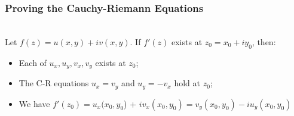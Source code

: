 \documentclass[10pt]{paper}
\newcommand{\gspc}{\vspace{0.13cm}} %
\newcommand{\gline}[0]{\gspc\\} %
\begin{document}
\subsubsection{Proving the Cauchy-Riemann Equations}
{
\newcommand{\zo}{z_0}\newcommand{\de}{\Delta}
\begin{theorem}{}{}\gline{}
  Let $f(z) = u(x,y) + iv(x,y)$. If $f'(z)$ exists at $z_0 = x_0 + iy_0$, then:
  \begin{itemize}
    \item Each of $u_x, u_y, v_x, v_y$ exists at $z_0$;
    \item The C-R equations $u_x = v_y$ and $u_y = -v_x$ hold at $z_0$;
    \item We have $f'(z_0) = u_x(x_0,y_0$) + $iv_x(x_0, y_0) = v_y(x_0,y_0) - iu_y(x_0,y_0)$
  \end{itemize}
\end{theorem}

}
\end{document}
